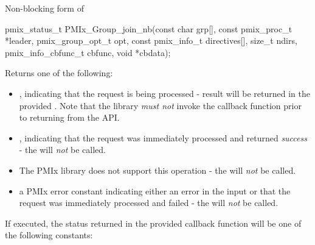 \summary

Non-blocking form of 

\format

\cspecificstart
\begin{codepar}
pmix_status_t
PMIx_Group_join_nb(const char grp[],
                   const pmix_proc_t *leader,
                   pmix_group_opt_t opt,
                   const pmix_info_t directives[], size_t ndirs,
                   pmix_info_cbfunc_t cbfunc, void *cbdata);
\end{codepar}
\cspecificend

\begin{arglist}
\end{arglist}

Returns one of the following:

\begin{itemize}
    \item {}, indicating that the request is being processed - result will be returned in the provided . Note that the library \emph{must not} invoke the callback function prior to returning from the \ac{API}.
    \item {}, indicating that the request was immediately processed and returned \textit{success} - the  will \textit{not} be called.
    \item {} The \ac{PMIx} library does not support this operation - the  will \textit{not} be called.
    \item a PMIx error constant indicating either an error in the input or that the request was immediately processed and failed - the  will \textit{not} be called.
\end{itemize}

If executed, the status returned in the provided callback function will be one of the following constants:

